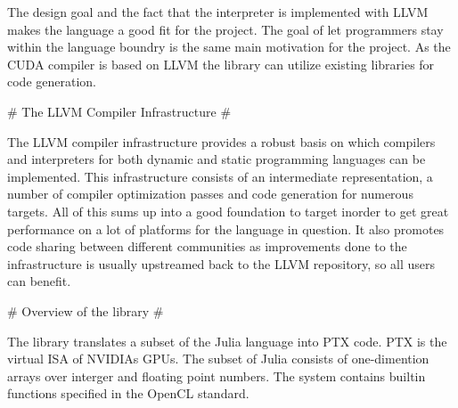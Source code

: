 \begin{markdown}
The design goal and the fact that the interpreter is implemented with
\gls{LLVM} makes the language a good fit for the project. The goal of
let programmers stay within the language boundry is the same main
motivation for the project. As the \gls{CUDA} compiler is based on
\gls{LLVM} the library can utilize existing libraries for code
generation.

# The LLVM Compiler Infrastructure #

The \gls{LLVM} compiler infrastructure provides a robust basis on
which compilers and interpreters for both dynamic and static
programming languages can be implemented. This infrastructure consists
of an intermediate representation, a number of compiler optimization
passes and code generation for numerous targets. All of this sums up
into a good foundation to target inorder to get great performance on a
lot of platforms for the language in question. It also promotes code
sharing between different communities as improvements done to the
infrastructure is usually upstreamed back to the LLVM repository, so
all users can benefit.

# Overview of the library #

The library translates a subset of the Julia language into \gls{PTX}
code. \gls{PTX} is the virtual \gls{ISA} of NVIDIAs
\glspl{GPU}. The subset of Julia consists of one-dimention arrays over
interger and floating point numbers. The system contains builtin
functions specified in the \gls{OpenCL} standard.

\end{markdown}
